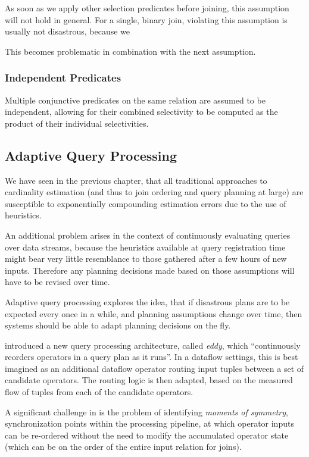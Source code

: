\documentclass[../index.tex]{subfiles}
\begin{document}
As soon as we apply other selection predicates before joining, this
assumption will not hold in general. For a single, binary join,
violating this assumption is usually not disastrous, because we 

This becomes problematic in
combination with the next assumption.

\subsubsection{Independent Predicates}

Multiple conjunctive predicates on the same relation are assumed to be
independent, allowing for their combined selectivity to be computed as
the product of their individual selectivities.

\subsection{Adaptive Query Processing}

We have seen in the previous chapter, that all traditional approaches
to cardinality estimation (and thus to join ordering and query
planning at large) are susceptible to exponentially compounding
estimation errors due to the use of heuristics.

An additional problem arises in the context of continuously evaluating
queries over data streams, because the heuristics available at query
registration time might bear very little resemblance to those gathered
after a few hours of new inputs. Therefore any planning decisions made
based on those assumptions will have to be revised over time.

Adaptive query processing explores the idea, that if disastrous plans
are to be expected every once in a while, and planning assumptions
change over time, then systems should be able to adapt planning
decisions on the fly.

\cite{avnur2000eddies} introduced a new query processing architecture,
called \emph{eddy}, which ``continuously reorders operators in a query
plan as it runs''. In a dataflow settings, this is best imagined as an
additional dataflow operator routing input tuples between a set of
candidate operators. The routing logic is then adapted, based on the
measured flow of tuples from each of the candidate operators.

A significant challenge in \cite{avnur2000eddies} is the problem of
identifying \emph{moments of symmetry}, synchronization points within
the processing pipeline, at which operator inputs can be re-ordered
without the need to modify the accumulated operator state (which can
be on the order of the entire input relation for joins).
\end{document}
